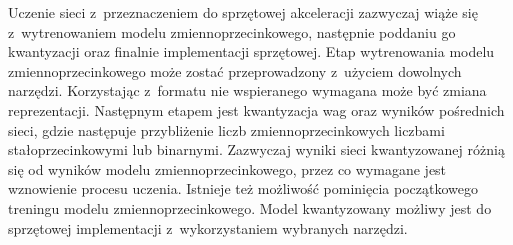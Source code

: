 Uczenie sieci z~przeznaczeniem do sprzętowej akceleracji zazwyczaj wiąże się z~wytrenowaniem modelu zmiennoprzecinkowego, następnie poddaniu go kwantyzacji oraz finalnie implementacji sprzętowej.
Etap wytrenowania modelu zmiennoprzecinkowego może zostać przeprowadzony z~użyciem
dowolnych narzędzi.
Korzystając z~formatu nie wspieranego wymagana może być zmiana reprezentacji.
Następnym etapem jest kwantyzacja wag oraz wyników pośrednich sieci, gdzie następuje przybliżenie liczb zmiennoprzecinkowych liczbami stałoprzecinkowymi lub binarnymi. 
Zazwyczaj wyniki sieci kwantyzowanej różnią się od wyników modelu zmiennoprzecinkowego, przez co wymagane jest wznowienie procesu uczenia.
Istnieje też możliwość pominięcia początkowego treningu modelu zmiennoprzecinkowego.
Model kwantyzowany możliwy jest do sprzętowej implementacji z~wykorzystaniem wybranych narzędzi.

